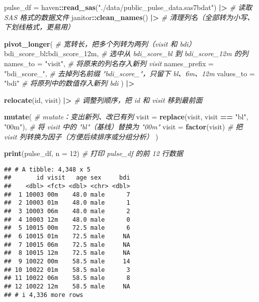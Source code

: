 \documentclass[
]{article}
\newenvironment{Shaded}{\begin{snugshade}}{\end{snugshade}}
\newcommand{\AttributeTok}[1]{\textcolor[rgb]{0.13,0.29,0.53}{#1}}
\newcommand{\CommentTok}[1]{\textcolor[rgb]{0.56,0.35,0.01}{\textit{#1}}}
\newcommand{\DecValTok}[1]{\textcolor[rgb]{0.00,0.00,0.81}{#1}}
\newcommand{\FunctionTok}[1]{\textcolor[rgb]{0.13,0.29,0.53}{\textbf{#1}}}
\newcommand{\NormalTok}[1]{#1}
\newcommand{\OtherTok}[1]{\textcolor[rgb]{0.56,0.35,0.01}{#1}}
\newcommand{\SpecialCharTok}[1]{\textcolor[rgb]{0.81,0.36,0.00}{\textbf{#1}}}
\newcommand{\StringTok}[1]{\textcolor[rgb]{0.31,0.60,0.02}{#1}}
\begin{document}
\begin{Shaded}
\begin{Highlighting}[]
\NormalTok{pulse\_df }\OtherTok{=} 
\NormalTok{  haven}\SpecialCharTok{::}\FunctionTok{read\_sas}\NormalTok{(}\StringTok{"./data/public\_pulse\_data.sas7bdat"}\NormalTok{) }\SpecialCharTok{|\textgreater{}}  \CommentTok{\# 读取 SAS 格式的数据文件}
\NormalTok{  janitor}\SpecialCharTok{::}\FunctionTok{clean\_names}\NormalTok{() }\SpecialCharTok{|\textgreater{}}                                \CommentTok{\# 清理列名（全部转为小写、下划线格式，更易用）}
  
  \FunctionTok{pivot\_longer}\NormalTok{(                                            }\CommentTok{\# 宽转长，把多个列转为两列（visit 和 bdi）}
\NormalTok{    bdi\_score\_bl}\SpecialCharTok{:}\NormalTok{bdi\_score\_12m,                            }\CommentTok{\# 选中从 bdi\_score\_bl 到 bdi\_score\_12m 的列}
    \AttributeTok{names\_to =} \StringTok{"visit"}\NormalTok{,                                    }\CommentTok{\# 将原来的列名存入新列 visit}
    \AttributeTok{names\_prefix =} \StringTok{"bdi\_score\_"}\NormalTok{,                           }\CommentTok{\# 去掉列名前缀 "bdi\_score\_"，只留下 bl、6m、12m}
    \AttributeTok{values\_to =} \StringTok{"bdi"}                                      \CommentTok{\# 将原列中的数值存入新列 bdi}
\NormalTok{  ) }\SpecialCharTok{|\textgreater{}}
  
  \FunctionTok{relocate}\NormalTok{(id, visit) }\SpecialCharTok{|\textgreater{}}                                   \CommentTok{\# 调整列顺序，把 id 和 visit 移到最前面}
  
  \FunctionTok{mutate}\NormalTok{(                                                  }\CommentTok{\# mutate：变出新列、改已有列}
    \AttributeTok{visit =} \FunctionTok{replace}\NormalTok{(visit, visit }\SpecialCharTok{==} \StringTok{"bl"}\NormalTok{, }\StringTok{"00m"}\NormalTok{),          }\CommentTok{\# 将 visit 中的 "bl"（基线）替换为 "00m"}
    \AttributeTok{visit =} \FunctionTok{factor}\NormalTok{(visit)                                  }\CommentTok{\# 把 visit 列转换为因子（方便后续排序或分组分析）}
\NormalTok{  )}

\FunctionTok{print}\NormalTok{(pulse\_df, }\AttributeTok{n =} \DecValTok{12}\NormalTok{)  }\CommentTok{\# 打印 pulse\_df 的前 12 行数据}
\end{Highlighting}
\end{Shaded}

\begin{verbatim}
## # A tibble: 4,348 x 5
##       id visit   age sex     bdi
##    <dbl> <fct> <dbl> <chr> <dbl>
##  1 10003 00m    48.0 male      7
##  2 10003 01m    48.0 male      1
##  3 10003 06m    48.0 male      2
##  4 10003 12m    48.0 male      0
##  5 10015 00m    72.5 male      6
##  6 10015 01m    72.5 male     NA
##  7 10015 06m    72.5 male     NA
##  8 10015 12m    72.5 male     NA
##  9 10022 00m    58.5 male     14
## 10 10022 01m    58.5 male      3
## 11 10022 06m    58.5 male      8
## 12 10022 12m    58.5 male     NA
## # i 4,336 more rows
\end{verbatim}
\end{document}
